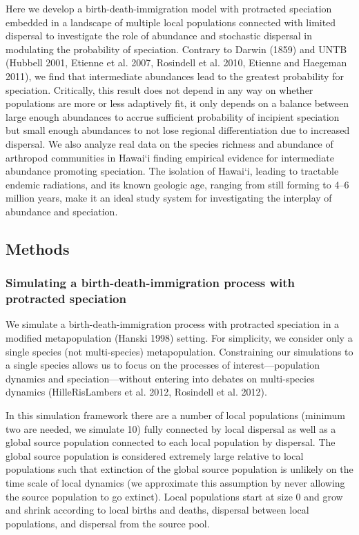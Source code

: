 \documentclass[
  letterpaper,
  DIV=11,
  numbers=noendperiod]{scrartcl}
\begin{document}
Here we develop a birth-death-immigration model with protracted
speciation embedded in a landscape of multiple local populations
connected with limited dispersal to investigate the role of abundance
and stochastic dispersal in modulating the probability of speciation.
Contrary to Darwin (1859) and UNTB (Hubbell 2001, Etienne et al. 2007,
Rosindell et al. 2010, Etienne and Haegeman 2011), we find that
intermediate abundances lead to the greatest probability for speciation.
Critically, this result does not depend in any way on whether
populations are more or less adaptively fit, it only depends on a
balance between large enough abundances to accrue sufficient probability
of incipient speciation but small enough abundances to not lose regional
differentiation due to increased dispersal. We also analyze real data on
the species richness and abundance of arthropod communities in Hawai`i
finding empirical evidence for intermediate abundance promoting
speciation. The isolation of Hawai`i, leading to tractable endemic
radiations, and its known geologic age, ranging from still forming to
4--6 million years, make it an ideal study system for investigating the
interplay of abundance and speciation.

\subsection{Methods}\label{methods}

\subsubsection{Simulating a birth-death-immigration process with
protracted
speciation}\label{simulating-a-birth-death-immigration-process-with-protracted-speciation}

We simulate a birth-death-immigration process with protracted speciation
in a modified metapopulation (Hanski 1998) setting. For simplicity, we
consider only a single species (not multi-species) metapopulation.
Constraining our simulations to a single species allows us to focus on
the processes of interest---population dynamics and speciation---without
entering into debates on multi-species dynamics (HilleRisLambers et al.
2012, Rosindell et al. 2012).

In this simulation framework there are a number of local populations
(minimum two are needed, we simulate 10) fully connected by local
dispersal as well as a global source population connected to each local
population by dispersal. The global source population is considered
extremely large relative to local populations such that extinction of
the global source population is unlikely on the time scale of local
dynamics (we approximate this assumption by never allowing the source
population to go extinct). Local populations start at size 0 and grow
and shrink according to local births and deaths, dispersal between local
populations, and dispersal from the source pool.
\end{document}

